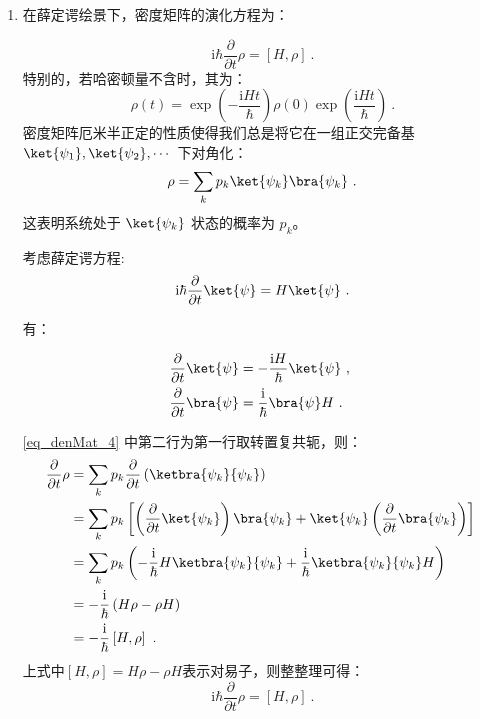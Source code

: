 \begin{enumerate}
\item 在薛定谔绘景下，密度矩阵的演化方程为：

    $$\mathrm{i}\hbar \frac{\partial}{\partial t} \rho= \left[ H, \rho \right]~.$$
    特别的，若哈密顿量不含时，其为：
    $$\rho \left( t \right) = \exp\left(-\frac{\mathrm{i}Ht}{\hbar}\right) \rho \left(0\right) \exp\left(\frac{\mathrm{i}Ht}{\hbar}\right)~.$$
    密度矩阵厄米半正定的性质使得我们总是将它在一组正交完备基 $\ket{\psi_1},\ket{\psi_2},\cdots$ 下对角化：
    \begin{equation}
    \rho = \sum\limits_k p_k\ket{\psi_k} \bra{\psi_k}~.
    \end{equation}
    这表明系统处于 $\ket{\psi_k}$ 状态的概率为 $p_k$。

    考虑薛定谔方程:
    $$\mathrm{i}\hbar\frac{\partial}{\partial t} \ket{\psi} = H \ket{\psi}~.$$

    有：

    \begin{equation}\label{eq_denMat_4}
    \begin{aligned}
    \frac{\partial}{\partial t}\ket{\psi} &= -\frac{\mathrm{i}H}{\hbar}\ket{\psi}~, \\
    \frac{\partial}{\partial t}\bra{\psi} &= \frac{\mathrm{i}}{\hbar}\bra{\psi}H~.
    \end{aligned}~
    \end{equation}

    \autoref{eq_denMat_4} 中第二行为第一行取转置复共轭，则：
    \begin{equation}\label{eq_denMat_2}
    \begin{aligned}
    \frac{\partial}{\partial t}\rho &= \sum\limits_kp_k\frac{\partial}{\partial t}\left( \ketbra{\psi_k}{\psi_k} \right) \\
    &= \sum\limits_k p_k\left[ \left(\frac{\partial}{\partial t}\ket{\psi_k}\right)\bra{\psi_k} + \ket{\psi_k}\left(\frac{\partial}{\partial t}\bra{\psi_k}\right)\right] \\ 
    &= \sum\limits_k p_k \left( -\frac{\mathrm{i}}{\hbar}H\ketbra{\psi_k}{\psi_k} + \frac{\mathrm{i}}{\hbar}\ketbra{\psi_k}{\psi_k}H \right) \\
    &=-\frac{\mathrm{i}}{\hbar}\left(  H\rho -  \rho H\right) \\
    &= -\frac{\mathrm{i}}{\hbar}\left[ H, \rho \right]~.
    \end{aligned}~
    \end{equation}
    上式中$\left[ H, \rho \right] = H\rho -  \rho H$表示对易子，则整整理可得：
    \begin{equation}\label{eq_denMat_5}
    \mathrm{i}\hbar \frac{\partial}{\partial t} \rho= \left[ H, \rho \right]~.
    \end{equation}


\end{enumerate}
